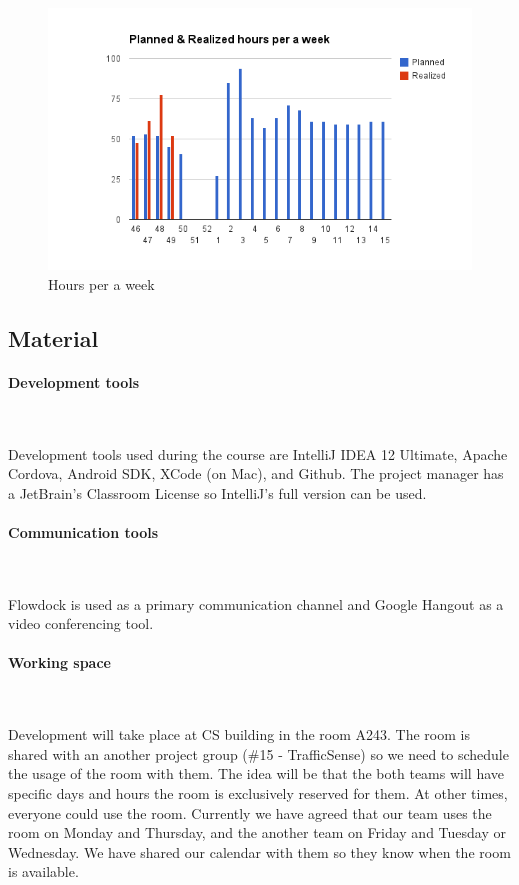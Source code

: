 \begin{figure}[H]
\centering
\includegraphics[width=1\textwidth]{imgs/chart_2.png}
\caption{Hours per a week}
\label{fig:hours_weeks}
\end{figure}

\subsection{Material}

\paragraph{Development tools}~

Development tools used during the course are IntelliJ IDEA 12
Ultimate, Apache Cordova, Android SDK, XCode (on Mac), and Github. The project
manager has a JetBrain's Classroom License so IntelliJ's full version can be
used.

\paragraph{Communication tools}~

Flowdock is used as a primary communication channel and Google Hangout as a
video conferencing tool.

\paragraph{Working space}~

Development will take place at CS building in the room A243. The room is shared
with an another project group (\#15 - TrafficSense) so we need to schedule the
usage of the room with them. The idea will be that the both teams will have
specific days and hours the room is exclusively reserved for them. At other
times, everyone could use the room. Currently we have agreed that our team uses
the room on Monday and Thursday, and the another team on Friday and Tuesday or
Wednesday. We have shared our calendar with them so they know when the room is
available.

